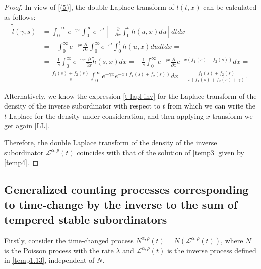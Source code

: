 \documentclass[12pt]{article}
\theoremstyle{definition}
\theoremstyle{plain}
\begin{document}
\begin{proof}
		In view of \eqref{(5)}, the double Laplace transform of $l(t,x)$ can be calculated as follows:
		\begin{align}
			\tilde{\tilde{l}}(\gamma, s) &= \int_0^{+\infty} e^{-\gamma x} \int_0^\infty e^{-st} \left[ -\frac{\partial}{\partial x} \int_0^t h(u,x) du \right] dt dx \nonumber\\
			&= - \int_0^\infty e^{-\gamma x} \frac{\partial}{\partial x} \int_0^\infty e^{-st} \int_0^t h(u,x) du dt dx = \nonumber\\
			&= -\frac{1}{s} \int_0^\infty e^{-\gamma x} \frac{\partial}{\partial x} \tilde{h}(s,x) dx = -\frac{1}{s} \int_0^\infty e^{-\gamma x} \frac{\partial}{\partial x} e^{-x(f_1(s) + f_2(s))} dx = \nonumber\\
			&= \frac{f_1(s) + f_2(s)}{s} \int_0^\infty e^{-\gamma x} e^{-x(f_1(s) + f_2(s))} dx = \frac{f_1(s) + f_2(s)}{s(f_1(s) + f_2(s) + \gamma)}.\label{LL}
		\end{align}
		
		Alternatively, we know  the expression \eqref{t-lapl-inv} for the  Laplace transform of the density of the inverse subordinator with respect to $t$ from which we can write the $t$-Laplace for the density  under consideration, and then applying $x$-transform we  get again \eqref{LL}.
		
		Therefore, the double Laplace transform of the density of the inverse subordinator $\mathcal{L}^{\alpha, p}(t)$ coincides with that of the solution of \eqref{temp3} given by \eqref{temp4}.\end{proof}
		
		
		

\subsection{Generalized counting processes  corresponding to time-change by the inverse to the sum of tempered stable subordinators}
 
Firstly, consider the time-changed process $N^{\alpha,\rho}(t)=N(\mathcal{L}^{\alpha,\rho}(t))$, where $N$ is the Poisson process with the rate $\lambda$ and $\mathcal{L}^{\alpha,\rho}(t)$ is the inverse process defined in \eqref{temp1.13}, independent of $N$. 
\end{document}
